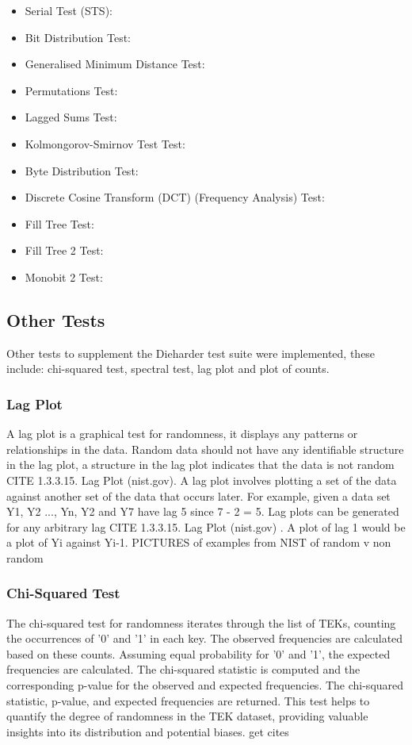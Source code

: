 \begin{itemize}
\item Serial Test (STS):
\item Bit Distribution Test:
\item Generalised Minimum Distance Test:
\item Permutations Test:
\item Lagged Sums Test:
\item Kolmongorov-Smirnov Test Test:
\item Byte Distribution Test:
\item Discrete Cosine Transform (DCT) (Frequency Analysis) Test:
\item Fill Tree Test:
\item Fill Tree 2 Test:
\item Monobit 2 Test:
\end{itemize}
\subsection{Other Tests}

Other tests to supplement the Dieharder test suite were implemented, these include: chi-squared test, spectral test, lag plot and plot of counts.\newline

\subsubsection{Lag Plot}
A lag plot is a graphical test for randomness, it displays any patterns or relationships in the data. Random data should not have any identifiable structure in the lag plot, a structure in the lag plot indicates that the data is not random CITE 1.3.3.15. Lag Plot (nist.gov). A lag plot involves plotting a set of the data against another set of the data that occurs later. For example, given a data set Y1, Y2 ..., Yn, Y2 and Y7 have lag 5 since 7 - 2 = 5. Lag plots can be generated for any arbitrary lag CITE 1.3.3.15. Lag Plot (nist.gov) . A plot of lag 1 would be a plot of Yi against Yi-1. PICTURES of examples from NIST of random v non random

\subsubsection{Chi-Squared Test}
The chi-squared test for randomness iterates through the list of TEKs, counting the occurrences of '0' and '1' in each key. The observed frequencies are calculated based on these counts. Assuming equal probability for '0' and '1', the expected frequencies are calculated. The chi-squared statistic is computed and the corresponding p-value for the observed and expected frequencies. The chi-squared statistic, p-value, and expected frequencies are returned. This test helps to quantify the degree of randomness in the TEK dataset, providing valuable insights into its distribution and potential biases. get cites

